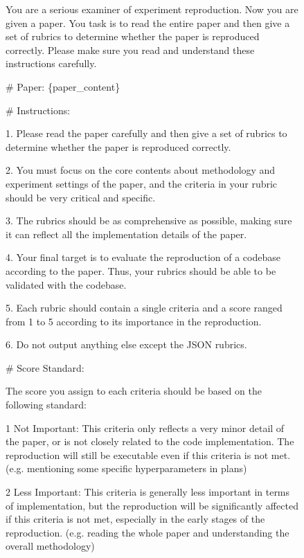 \documentclass[11pt]{article}
\begin{document}
\begin{figure}[h]
\centering
{}
\begin{tcolorbox}[]
You are a serious examiner of experiment reproduction. 
Now you are given a paper. You task is to read the entire paper and then give a set of rubrics to determine whether the paper is reproduced correctly.
Please make sure you read and understand these instructions carefully.


\# Paper:
\{paper\_content\}

\# Instructions:

1. Please read the paper carefully and then give a set of rubrics to determine whether the paper is reproduced correctly.

2. You must focus on the core contents about methodology and experiment settings of the paper, and the criteria in your rubric should be very critical and specific.

3. The rubrics should be as comprehensive as possible, making sure it can reflect all the implementation details of the paper.

4. Your final target is to evaluate the reproduction of a codebase according to the paper. Thus, your rubrics should be able to be validated with the codebase.

5. Each rubric should contain a single criteria and a score ranged from 1 to 5 according to its importance in the reproduction.

6. Do not output anything else except the JSON rubrics.

\# Score Standard:

The score you assign to each criteria should be based on the following standard:

1 Not Important: This criteria only reflects a very minor detail of the paper, or is not closely related to the code implementation. The reproduction will still be executable even if this criteria is not met. (e.g. mentioning some specific hyperparameters in plans)

2 Less Important: This criteria is generally less important in terms of implementation, but the reproduction will be significantly affected if this criteria is not met, especially in the early stages of the reproduction. (e.g. reading the whole paper and understanding the overall methodology)


\end{tcolorbox}
\end{figure}
\end{document}
